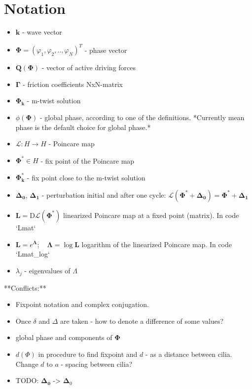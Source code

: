 \documentclass[a4paper,12pt]{article}
\newcommand{\D}{\Delta}%
\begin{document}
\section*{Notation}

\begin{itemize}
\item $\mathbf{k}$ - wave vector
\item $\mathbf{\Phi}= (\varphi_1, \varphi_2, .., \varphi_{N})^T $ - phase vector
\item $ \mathbf{Q(\Phi)}$ - vector of active driving forces
\item $ \mathbf{\Gamma}$ - friction coefficients NxN-matrix
\item $\mathbf{\Phi_k}$ - m-twist solution
\item $\phi(\mathbf{\Phi})$ - global phase, according to one of the definitions. *Currently mean phase is the default choice for global phase.*
\item $\mathcal{L}: H \rightarrow H$ - Poincare map
\item $\mathbf{\Phi^*} \in H$ - fix point of the Poincare map
\item $\mathbf{\Phi^{*}_k}$ - fix point close to the m-twist solution
\item $\mathbf{\Delta_0}$, $\mathbf{\Delta_1}$ - perturbation initial and after one cycle: $\mathcal{L}(\mathbf{\Phi^{*}} + \mathbf{\Delta_0}) = \mathbf{\Phi^{*}} + \mathbf{\Delta_1}$
\item $\mathbf{L} = \mathrm{D}\mathcal{L}(\mathbf{\Phi^*})$ linearized Poincare map at a fixed point (matrix). In code `Lmat`
\item $\mathbf{L} = e^\mathbf{\Lambda}; \quad \mathbf{\Lambda} = \log \mathbf{L} $  logarithm of the linearized Poincare map. In code `Lmat\_log`
\item $\lambda_j$ - eigenvalues of $\Lambda$
\end{itemize}

**Conflicts:**

\begin{itemize}

\item Fixpoint notation and complex conjugation.
\item Once $\delta$ and $\D$ are taken - how to denote a difference of some values?
\item global phase and components of $\mathbf{\Phi}$
\item $d(\Phi)$ in procedure to find fixpoint and $d$ - as a distance between cilia. Change $d$ to $a$ - spacing between cilia?
\item TODO: $\mathbf{\Delta_0}$ -> $\mathbf{\Delta}_0$ 

\end{itemize}
\end{document}
